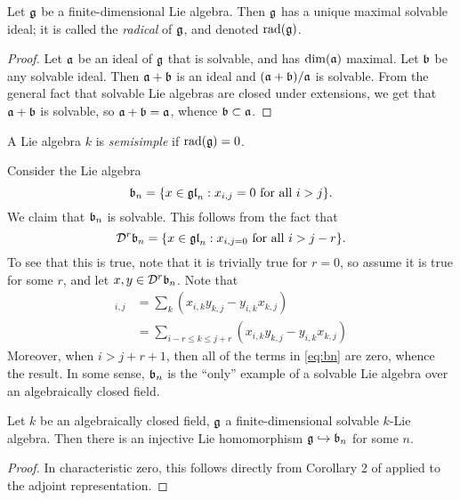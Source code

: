 \begin{lemma}
Let $\mathfrak{g}$ be a finite-dimensional Lie algebra. Then $\mathfrak{g}$ has a unique maximal 
solvable ideal; it is called the \emph{radical} of $\mathfrak{g}$, and denoted 
$\operatorname{rad}(\mathfrak{g})$. 
\end{lemma}
\begin{proof}
Let $\mathfrak{a}$ be an ideal of $\mathfrak{g}$ that is solvable, and has $\dim(\mathfrak{a})$ maximal. 
Let $\mathfrak{b}$ be any solvable ideal. Then $\mathfrak{a}+\mathfrak{b}$ is an ideal and 
$(\mathfrak{a}+\mathfrak{b})/\mathfrak{a}$ is solvable. From the general fact that solvable Lie algebras 
are closed under extensions, we get that $\mathfrak{a}+\mathfrak{b}$ is solvable, so 
$\mathfrak{a}+\mathfrak{b}=\mathfrak{a}$, whence $\mathfrak{b}\subset \mathfrak{a}$. 
\end{proof}

\begin{definition}
A Lie algebra $k$ is \emph{semisimple} if $\operatorname{rad}(\mathfrak{g})=0$. 
\end{definition}

\begin{example}
Consider the Lie algebra 
\[
  \mathfrak{b}_n = \{x\in \mathfrak{gl}_n : x_{i,j}=0\text{ for all }i>j\} .
\]
We claim that $\mathfrak{b}_n$ is solvable. This follows from the fact that 
\[
  \mathcal{D}^r \mathfrak{b}_n = \{x\in \mathfrak{gl}_n : x_{i,j=0}\text{ for all }i>j-r\} .
\]
To see that this is true, note that it is trivially true for $r=0$, so 
assume it is true for some $r$, and let $x,y\in \mathcal{D}^r \mathfrak{b}_n$. Note that 
\begin{align*}
  [x,y]_{i,j} 
    &= \sum_k (x_{i,k}y_{k,j}-y_{i,k}x_{k,j}) \\ \tag{$\ast$}\label{eq:bn}
    &= \sum_{i-r\leqslant k \leqslant j+r} (x_{i,k}y_{k,j}-y_{i,k}x_{k,j})
\end{align*}
Moreover, when $i>j+r+1$, then all of the terms in \eqref{eq:bn} are 
zero, whence the result. In some sense, $\mathfrak{b}_n$ is the 
``only'' example of a solvable Lie algebra over an algebraically closed 
field. 
\end{example}

\begin{theorem}
Let $k$ be an algebraically closed field, $\mathfrak{g}$ a finite-dimensional 
solvable $k$-Lie algebra. Then there is an injective Lie homomorphism 
$\mathfrak{g}\hookrightarrow \mathfrak{b}_n$ for some $n$. 
\end{theorem}
\begin{proof}
In characteristic zero, this follows directly from Corollary 2 of 
\cite[I \S 5.3]{bourbaki-lie-alg-1-3} applied to the adjoint representation. 
\end{proof}

